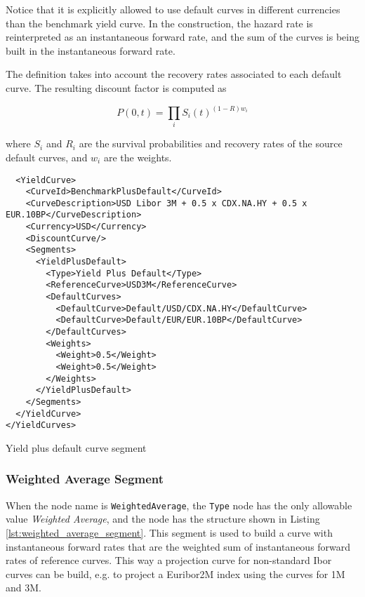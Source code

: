 Notice that it is explicitly allowed to use default curves in different currencies than the benchmark yield curve. In
the construction, the hazard rate is reinterpreted as an instantaneous forward rate, and the sum of the curves is being
built in the instantaneous forward rate.

The definition takes into account the recovery rates associated to each default curve. The resulting discount factor is
computed as

\begin{equation}
P(0,t) = \prod_i  S_i(t)^{(1-R)w_i}
\end{equation}

where $S_i$ and $R_i$ are the survival probabilities and recovery rates of the source default curves, and $w_i$ are the
weights.

\begin{listing}[H]
\begin{verbatim}
  <YieldCurve>
    <CurveId>BenchmarkPlusDefault</CurveId>
    <CurveDescription>USD Libor 3M + 0.5 x CDX.NA.HY + 0.5 x EUR.10BP</CurveDescription>
    <Currency>USD</Currency>
    <DiscountCurve/>
    <Segments>
      <YieldPlusDefault>
        <Type>Yield Plus Default</Type>
        <ReferenceCurve>USD3M</ReferenceCurve>
        <DefaultCurves>
          <DefaultCurve>Default/USD/CDX.NA.HY</DefaultCurve>
          <DefaultCurve>Default/EUR/EUR.10BP</DefaultCurve>
        </DefaultCurves>
        <Weights>
          <Weight>0.5</Weight>
          <Weight>0.5</Weight>
        </Weights>
      </YieldPlusDefault>
    </Segments>
  </YieldCurve>
</YieldCurves>
\end{verbatim}
\caption{Yield plus default curve segment}
\label{lst:yield_plus_default_segment}
\end{listing}

\subsubsection*{Weighted Average Segment}
\label{sec:weigthed_average}

When the node name is \lstinline!WeightedAverage!, the \lstinline!Type! node has the only allowable value
\emph{Weighted Average}, and the node has the structure shown in Listing \ref{lst:weighted_average_segment}. This segment
is used to build a curve with instantaneous forward rates that are the weighted sum of instantaneous forward rates of
reference curves. This way a projection curve for non-standard Ibor curves can be build, e.g. to project a Euribor2M
index using the curves for 1M and 3M.

